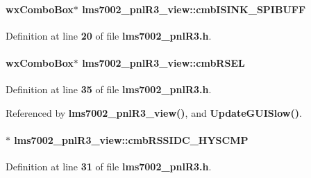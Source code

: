 \paragraph[{cmb\+I\+S\+I\+N\+K\+\_\+\+S\+P\+I\+B\+U\+FF}]{\setlength{\rightskip}{0pt plus 5cm}wx\+Combo\+Box$\ast$ lms7002\+\_\+pnl\+R3\+\_\+view\+::cmb\+I\+S\+I\+N\+K\+\_\+\+S\+P\+I\+B\+U\+FF\hspace{0.3cm}{\ttfamily [protected]}}\label{classlms7002__pnlR3__view_a0a1d212744b7cd7b7357ffca45467de2}


Definition at line {\bf 20} of file {\bf lms7002\+\_\+pnl\+R3.\+h}.

\paragraph[{cmb\+R\+S\+EL}]{\setlength{\rightskip}{0pt plus 5cm}wx\+Combo\+Box$\ast$ lms7002\+\_\+pnl\+R3\+\_\+view\+::cmb\+R\+S\+EL\hspace{0.3cm}{\ttfamily [protected]}}\label{classlms7002__pnlR3__view_a0405547612636397629a89c1f4caa7a8}


Definition at line {\bf 35} of file {\bf lms7002\+\_\+pnl\+R3.\+h}.



Referenced by {\bf lms7002\+\_\+pnl\+R3\+\_\+view()}, and {\bf Update\+G\+U\+I\+Slow()}.

\paragraph[{cmb\+R\+S\+S\+I\+D\+C\+\_\+\+H\+Y\+S\+C\+MP}]{$\ast$ lms7002\+\_\+pnl\+R3\+\_\+view\+::cmb\+R\+S\+S\+I\+D\+C\+\_\+\+H\+Y\+S\+C\+MP\hspace{0.3cm}{\ttfamily [protected]}}\label{classlms7002__pnlR3__view_ac45035d7a49c51ffe08712349af0987e}


Definition at line {\bf 31} of file {\bf lms7002\+\_\+pnl\+R3.\+h}.



